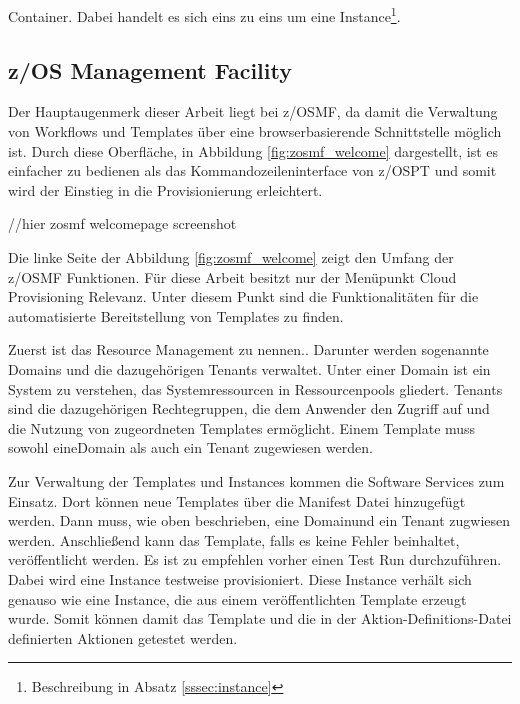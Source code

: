 \glqq Container\grqq{}.
Dabei handelt es sich eins zu eins um eine \glqq Instance\grqq \footnote{Beschreibung in Absatz \ref{sssec:instance}}.
\cite{IBM.2019b}

\subsection{z/OS Management Facility}\label{sssec:zosmf}
Der Hauptaugenmerk dieser Arbeit liegt  bei z/OSMF, da damit die Verwaltung von Workflows und Templates über eine browserbasierende Schnittstelle möglich ist.
Durch diese Oberfläche, in Abbildung \ref{fig:zosmf_welcome} dargestellt, ist es einfacher zu bedienen als das Kommandozeileninterface von z/OSPT  und somit wird der Einstieg in die Provisionierung erleichtert.

//hier zosmf welcomepage screenshot

Die linke Seite der Abbildung \ref{fig:zosmf_welcome} zeigt den Umfang der z/OSMF  Funktionen.
Für diese Arbeit besitzt nur der Menüpunkt \glqq Cloud Provisioning\grqq{} Relevanz.
Unter diesem Punkt sind die Funktionalitäten für die automatisierte Bereitstellung von Templates zu finden.
\cite{Rotthove.2018}

Zuerst ist das \glqq Resource Management\grqq{} zu nennen..
Darunter werden sogenannte \glqq Domains\grqq{} und die dazugehörigen \glqq Tenants\grqq{} verwaltet.
Unter einer \glqq Domain\grqq{} ist ein System zu verstehen, das Systemressourcen in Ressourcenpools gliedert.
\glqq Tenants\grqq{} sind die dazugehörigen Rechtegruppen, die dem Anwender den Zugriff auf und die Nutzung von zugeordneten Templates ermöglicht.
Einem Template muss sowohl eine\glqq Domain\grqq{} als auch ein \glqq Tenant\grqq{} zugewiesen werden.
\cite{Rotthove.2018}

Zur Verwaltung der Templates und Instances kommen die \glqq Software Services\grqq{} zum Einsatz.
Dort können neue Templates über die \glqq Manifest Datei\grqq{} hinzugefügt werden.
Dann muss, wie oben beschrieben, eine \glqq Domain\dq und ein \glqq Tenant\grqq{} zugwiesen werden.
Anschließend kann das Template, falls es keine Fehler beinhaltet, veröffentlicht werden.
Es ist zu empfehlen vorher einen \glqq Test Run\grqq{} durchzuführen.
Dabei wird eine Instance testweise provisioniert.
Diese Instance verhält sich genauso wie eine Instance, die aus einem veröffentlichten Template erzeugt wurde.
Somit können damit das Template und die in der Aktion-Definitions-Datei definierten Aktionen getestet werden.
\cite{Rotthove.2018}
